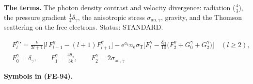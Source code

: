 \documentclass[
  10pt,
]{article}
\begin{document}
\textbf{The terms.} The photon density contrast and velocity divergence:
radiation (\(\frac43\)), the pressure gradient \(\frac14\delta_\gamma\),
the anisotropic stress \(\sigma_{\mathrm{an},\gamma}\), gravity, and the
Thomson scattering on the free electrons. Status: STANDARD.

\[
\begin{aligned}
&F^\gamma_l{}' = \frac{k}{2l + 1}\big[l\,F^\gamma_{l-1} - (l + 1)F^\gamma_{l+1}\big]
 - \mathrm{e}^{a_4}n_{\mathrm{e}}\sigma_{\mathrm{T}}\Big[F^\gamma_l -
 \frac{\delta_{l2}}{10}\big(F^\gamma_2 + G^\gamma_0 + G^\gamma_2\big)\Big]
 \quad (l \ge 2),\\
&F^\gamma_0 = \delta_\gamma,\qquad F^\gamma_1 = \frac{4\theta_\gamma}{3k},\qquad F^\gamma_2 =
 2\sigma_{\mathrm{an},\gamma}
\end{aligned} \tag{FE-94}
\]

\textbf{Symbols in (FE-94).}
\end{document}
